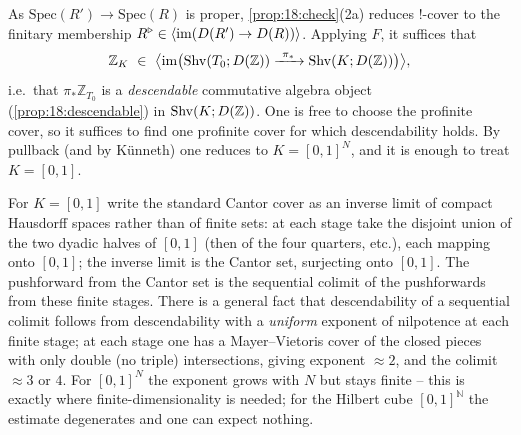 \begin{remark}
\label{rmk:20:descendability}
As $\mathrm{Spec}(R')\to\mathrm{Spec}(R)$ is proper, \cref{prop:18:check}(2a)
reduces $!$-cover to the finitary membership $R^{\triangleright}\in\langle\operatorname{im}
(D(R')\to D(R))\rangle$. Applying $F$, it suffices that
\begin{equation*}
\mathbb Z_K\ \in\ \bigl\langle\operatorname{im}\bigl(\Shv(T_0;D(\mathbb Z))
\xrightarrow{\ \pi_*\ }\Shv(K;D(\mathbb Z))\bigr)\bigr\rangle,
\end{equation*}
i.e.\ that $\pi_*\mathbb Z_{T_0}$ is a \emph{descendable} commutative algebra
object (\cref{prop:18:descendable}) in $\operatorname{Shv}(K;D(\mathbb Z))$. One is free to
choose the profinite cover, so it suffices to find one profinite cover for which
descendability holds. By pullback (and by K\"unneth) one reduces to
$K=[0,1]^N$, and it is enough to treat $K=[0,1]$.
\end{remark}

\begin{remark}
\label{rmk:20:cantor-cover}
For $K=[0,1]$ write the standard Cantor cover as an inverse limit of compact
Hausdorff spaces rather than of finite sets: at each stage take the disjoint
union of the two dyadic halves of $[0,1]$ (then of the four quarters, etc.),
each mapping onto $[0,1]$; the inverse limit is the Cantor set, surjecting onto
$[0,1]$. The pushforward from the Cantor set is the sequential colimit of the
pushforwards from these finite stages. There is a general fact that
descendability of a sequential colimit follows from descendability with a
\emph{uniform} exponent of nilpotence at each finite stage; at each stage one has
a Mayer--Vietoris cover of the closed pieces with only double (no triple)
intersections, giving exponent $\approx 2$, and the colimit $\approx 3$ or $4$.
For $[0,1]^N$ the exponent grows with $N$ but stays finite -- this is exactly
where finite-dimensionality is needed; for the Hilbert cube $[0,1]^{\mathbb N}$
the estimate degenerates and one can expect nothing.
\end{remark}


